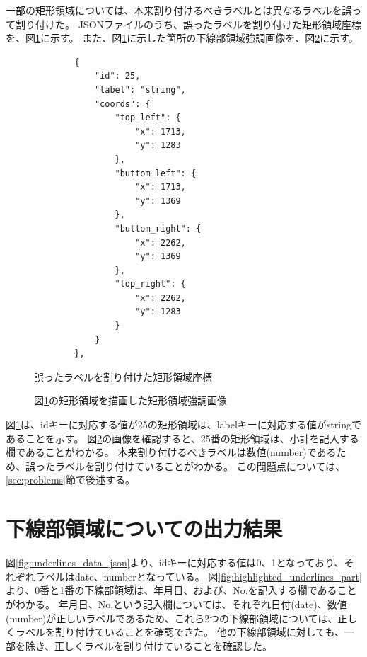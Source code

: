 一部の矩形領域については、本来割り付けるべきラベルとは異なるラベルを誤って割り付けた。
JSONファイルのうち、誤ったラベルを割り付けた矩形領域座標を、図\ref{fig:rects_data_miss_json}に示す。
また、図\ref{fig:rects_data_miss_json}に示した箇所の下線部領域強調画像を、図\ref{fig:highlighted_rects_miss_part}に示す。

\lstset{language=}
\begin{figure}[t]
    \begin{lstlisting}
        {
            "id": 25,
            "label": "string",
            "coords": {
                "top_left": {
                    "x": 1713,
                    "y": 1283
                },
                "buttom_left": {
                    "x": 1713,
                    "y": 1369
                },
                "buttom_right": {
                    "x": 2262,
                    "y": 1369
                },
                "top_right": {
                    "x": 2262,
                    "y": 1283
                }
            }
        },
    \end{lstlisting}
    \caption{誤ったラベルを割り付けた矩形領域座標}\label{fig:rects_data_miss_json}
\end{figure}

\begin{figure}[t]
    \begin{center}
        \caption{図\ref{fig:rects_data_miss_json}の矩形領域を描画した矩形領域強調画像}
        \label{fig:highlighted_rects_miss_part}
    \end{center}
\end{figure}

図\ref{fig:rects_data_miss_json}は、idキーに対応する値が25の矩形領域は、labelキーに対応する値がstringであることを示す。
図\ref{fig:highlighted_rects_miss_part}の画像を確認すると、25番の矩形領域は、小計を記入する欄であることがわかる。
本来割り付けるべきラベルは数値(number)であるため、誤ったラベルを割り付けていることがわかる。
この問題点については、\ref{sec:problems}節で後述する。


\section{下線部領域についての出力結果}\label{sec:result_underline}
図\ref{fig:underlines_data_json}より、idキーに対応する値は0、1となっており、それぞれラベルはdate、numberとなっている。
図\ref{fig:highlighted_underlines_part}より、0番と1番の下線部領域は、年月日、および、No.を記入する欄であることがわかる。
年月日、No.という記入欄については、それぞれ日付(date)、数値(number)が正しいラベルであるため、これら2つの下線部領域については、正しくラベルを割り付けていることを確認できた。
他の下線部領域に対しても、一部を除き、正しくラベルを割り付けていることを確認した。

